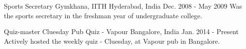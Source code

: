 \begin{cventries}
  \cventry
    {Sports Secretary}
    {Gymkhana, IITH}
    {Hyderabad, India}
    {Dec. 2008 - May 2009}
    {
    Was the sports secretary in the freshman year of undergraduate college.
    }
    
  \cventry
    {Quiz-master}
    {Cluesday Pub Quiz - Vapour}
    {Bangalore, India}
    {Jan. 2014 - Present}
    {
     Actively hosted the weekly quiz - Cluesday, at Vapour pub in Bangalore.
    }
\end{cventries}
